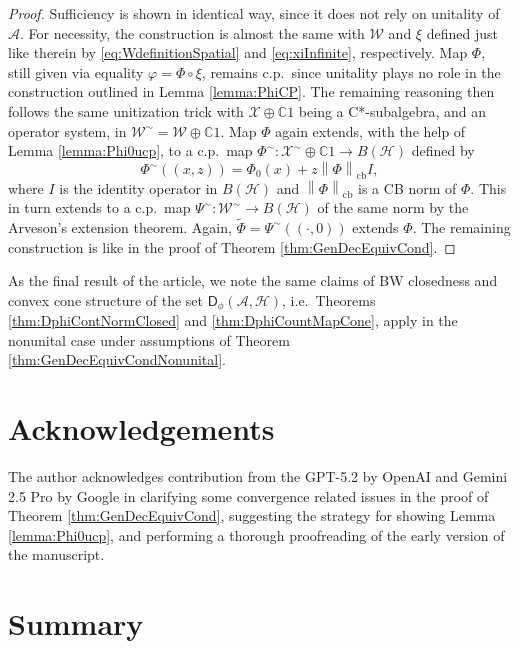 \documentclass[reqno]{amsart}
\theoremstyle{plain}
\numberwithin{equation}{section}
\numberwithin{theorem}{section}
\numberwithin{lemma}{section}
\numberwithin{definition}{section}
\numberwithin{corollary}{section}
\numberwithin{remark}{section}
\newcommand{\complexes}{\mathbb{C}}
\newcommand{\cbnorm}[1]{\left\| #1 \right\|_{\mathrm{cb}}}
\newcommand{\hilbert}{\mathcal{H}}
\newcommand{\gdec}[3]{\mathsf{D}_{#1}(#2,#3)}
\begin{document}
\begin{proof}
    Sufficiency is shown in identical way, since it does not rely on unitality of $\mathscr{A}$. For necessity, the construction is almost the same with $\mathscr{W}$ and $\xi$ defined just like therein by \eqref{eq:WdefinitionSpatial} and \eqref{eq:xiInfinite}, respectively. Map $\Phi$, still given via equality $\varphi = \Phi\circ\xi$, remains c.p.~since unitality plays no role in the construction outlined in Lemma \ref{lemma:PhiCP}. The remaining reasoning then follows the same unitization trick with $\mathscr{X}\oplus\complexes 1$ being a C*-subalgebra, and an operator system, in $\mathscr{W}^\sim = \mathscr{W}\oplus \complexes 1$. Map $\Phi$ again extends, with the help of Lemma \ref{lemma:Phi0ucp}, to a c.p.~map $\Phi^\sim : \mathscr{X}^\sim \oplus \complexes 1 \to B(\hilbert)$ defined by
    \begin{equation}
        \Phi^{\sim} ((x,z)) = \Phi_0 (x) + z \cbnorm{\Phi} I,
    \end{equation}
    where $I$ is the identity operator in $B(\hilbert)$ and $\cbnorm{\Phi}$ is a CB norm of $\Phi$. This in turn extends to a c.p.~map $\Psi^{\sim} : \mathscr{W}^\sim \to B(\hilbert)$ of the same norm by the Arveson's extension theorem. Again, $\tilde{\Phi} = \Psi^{\sim}((\cdot,0))$ extends $\Phi$. The remaining construction is like in the proof of Theorem \ref{thm:GenDecEquivCond}.
\end{proof}

As the final result of the article, we note the same claims of BW closedness and convex cone structure of the set $\gdec{\phi}{\mathscr{A}}{\hilbert}$, i.e.~Theorems \ref{thm:DphiContNormClosed} and \ref{thm:DphiCountMapCone}, apply in the nonunital case under assumptions of Theorem \ref{thm:GenDecEquivCondNonunital}.

\section{Acknowledgements}

The author acknowledges contribution from the GPT-5.2 by OpenAI and Gemini 2.5 Pro by Google in clarifying some convergence related issues in the proof of Theorem \ref{thm:GenDecEquivCond}, suggesting the strategy for showing Lemma \ref{lemma:Phi0ucp}, and performing a thorough proofreading of the early version of the manuscript.

\section{Summary}
\end{document}
